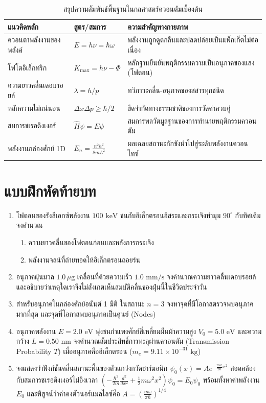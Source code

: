 \begin{table}[H]
\centering
\small
\begin{tabularx}{\textwidth}{l >{\centering\arraybackslash}p{4.2cm} Y}
\toprule
\textbf{แนวคิดหลัก} & \textbf{สูตร/สมการ} & \textbf{ความสำคัญทางกายภาพ} \\
\midrule
ควอนตาพลังงานของพลังค์ & $E = h\nu = \hbar\omega$ & พลังงานถูกดูดกลืนและปลดปล่อยเป็นแพ็กเก็ตไม่ต่อเนื่อง \\
โฟโตอิเล็กทริก & $K_{\max} = h\nu - \Phi$ & หลักฐานยืนยันพฤติกรรมความเป็นอนุภาคของแสง (โฟตอน) \\
ความยาวคลื่นเดอบรอยล์ & $\lambda = h/p$ & ทวิภาวะคลื่น-อนุภาคของสสารทุกชนิด \\
หลักความไม่แน่นอน & $\Delta x \Delta p \ge \hbar/2$ & ขีดจำกัดทางธรรมชาติของการวัดค่าควบคู่ \\
สมการชเรอดิงเงอร์ & $\hat{H}\psi = E\psi$ & สมการพลวัตมูลฐานของการทำนายพฤติกรรมควอนตัม \\
พลังงานกล่องศักย์ 1D & $E_n = \frac{n^2 h^2}{8mL^2}$ & ผลเฉลยสถานะกักขังนำไปสู่ระดับพลังงานควอนไทซ์ \\
\bottomrule
\end{tabularx}
\caption{สรุปความสัมพันธ์พื้นฐานในกลศาสตร์ควอนตัมเบื้องต้น}
\label{tab:quantum_summary}
\end{table}

\section{แบบฝึกหัดท้ายบท}
\begin{enumerate}
    \item โฟตอนของรังสีเอกซ์พลังงาน $100\text{ keV}$ ชนกับอิเล็กตรอนอิสระและกระเจิงทำมุม $90^\circ$ กับทิศเดิม จงคำนวณ
    \begin{enumerate}
        \item ความยาวคลื่นของโฟตอนก่อนและหลังการกระเจิง
        \item พลังงานจลน์ที่ถ่ายทอดให้อิเล็กตรอนถอยร่น
    \end{enumerate}
    \item อนุภาคฝุ่นมวล $1.0\,\mu\text{g}$ เคลื่อนที่ด้วยความเร็ว $1.0\text{ mm/s}$ จงคำนวณความยาวคลื่นเดอบรอยล์ และอธิบายว่าเหตุใดเราจึงไม่สังเกตเห็นสมบัติคลื่นของฝุ่นนี้ในชีวิตประจำวัน
    \item สำหรับอนุภาคในกล่องศักย์อนันต์ 1 มิติ ในสถานะ $n=3$ จงหาจุดที่มีโอกาสตรวจพบอนุภาคมากที่สุด และจุดที่โอกาสพบอนุภาคเป็นศูนย์ (Nodes)
    \item อนุภาคพลังงาน $E = 2.0\text{ eV}$ พุ่งชนกำแพงศักย์สี่เหลี่ยมผืนผ้าความสูง $V_0 = 5.0\text{ eV}$ และความกว้าง $L = 0.50\text{ nm}$ จงคำนวณสัมประสิทธิ์การทะลุผ่านควอนตัม (Transmission Probability $T$) เมื่ออนุภาคคืออิเล็กตรอน ($m_e = 9.11 \times 10^{-31}\text{ kg}$)
    \item จงแสดงว่าฟังก์ชันคลื่นสถานะพื้นของตัวแกว่งกวัดฮาร์มอนิก $\psi_0(x) = A e^{-\frac{m\omega}{2\hbar}x^2}$ สอดคล้องกับสมการชเรอดิงเงอร์ไม่อิงเวลา $\left(-\frac{\hbar^2}{2m}\frac{d^2}{dx^2} + \frac{1}{2}m\omega^2 x^2\right)\psi_0 = E_0 \psi_0$ พร้อมทั้งหาค่าพลังงาน $E_0$ และพิสูจน์ว่าค่าคงตัวนอร์แมลไลซ์คือ $A = \left(\frac{m\omega}{\pi\hbar}\right)^{1/4}$
\end{enumerate}
